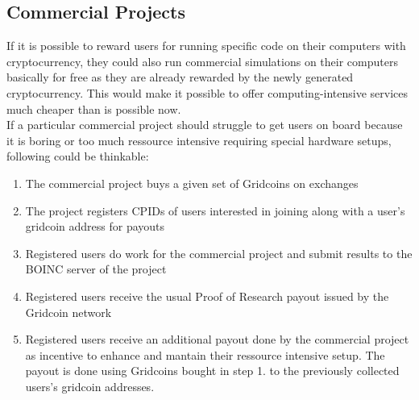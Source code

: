 \subsection{Commercial Projects}

If it is possible to reward users for running specific code on their computers with cryptocurrency, they could also run commercial simulations on their computers basically for free as they are already rewarded by the newly generated cryptocurrency. This would make it possible to offer computing-intensive services much cheaper than is possible now.\\

If a particular commercial project should struggle to get users on board because it is boring or too much ressource intensive requiring special hardware setups, following could be thinkable:

\begin{enumerate}
	\item The commercial project buys a given set of Gridcoins on exchanges
	\item The project registers CPIDs of users interested in joining along with a user's gridcoin address for payouts
	\item Registered users do work for the commercial project and submit results to the BOINC server of the project
	\item Registered users receive the usual Proof of Research payout issued by the Gridcoin network
	\item Registered users receive an additional payout done by the commercial project as incentive to enhance and mantain their ressource intensive setup. The payout is done using Gridcoins bought in step 1. to the previously collected users's gridcoin addresses.
\end{enumerate}